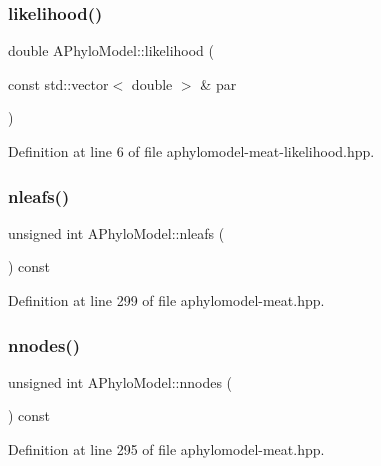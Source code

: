 \subsubsection{\texorpdfstring{likelihood()}{likelihood()}}
{\footnotesize\ttfamily double A\+Phylo\+Model\+::likelihood (\begin{DoxyParamCaption}\item[{const std\+::vector$<$ double $>$ \&}]{par }\end{DoxyParamCaption})}



Definition at line 6 of file aphylomodel-\/meat-\/likelihood.\+hpp.

\mbox{\label{class_a_phylo_model_adfb761d08367323cd94e917a5249bd86}} 
\subsubsection{\texorpdfstring{nleafs()}{nleafs()}}
{\footnotesize\ttfamily unsigned int A\+Phylo\+Model\+::nleafs (\begin{DoxyParamCaption}{ }\end{DoxyParamCaption}) const}



Definition at line 299 of file aphylomodel-\/meat.\+hpp.

\mbox{\label{class_a_phylo_model_a5a13086298e421d18ed60e6ecfced009}} 
\subsubsection{\texorpdfstring{nnodes()}{nnodes()}}
{\footnotesize\ttfamily unsigned int A\+Phylo\+Model\+::nnodes (\begin{DoxyParamCaption}{ }\end{DoxyParamCaption}) const}



Definition at line 295 of file aphylomodel-\/meat.\+hpp.

\mbox{\label{class_a_phylo_model_ada9ba3e2df8586216573fa27566d92cb}} 
